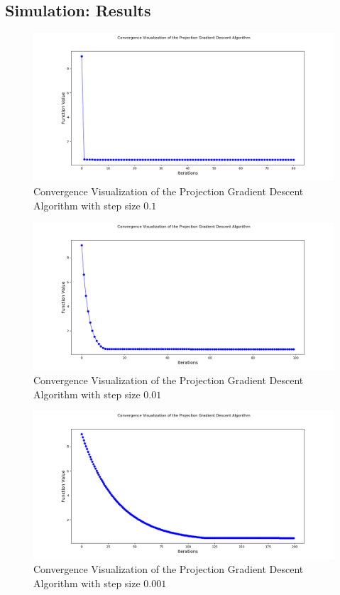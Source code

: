 \documentclass[12pt, draftcls, onecolumn]{IEEEtran}
\begin{document}
\subsection{Simulation: Results}
\begin{figure}[t]
\includegraphics[width=1.0\textwidth]{PGD_Convergence_Gamma_Point1.png}
\caption{Convergence Visualization of the Projection Gradient Descent Algorithm with step size $0.1$}
\label{fig:mesh1}
\centering
\end{figure}
\begin{figure}[t]
\includegraphics[width=1.0\textwidth]{PGD_Convergence_Gamma_Point01.png}
\caption{Convergence Visualization of the Projection Gradient Descent Algorithm with step size $0.01$}
\label{fig:mesh2}
\centering
\end{figure}
\begin{figure}[t]
\includegraphics[width=1.0\textwidth]{PGD_Convergence_Gamma_Point001.png}
\caption{Convergence Visualization of the Projection Gradient Descent Algorithm with step size $0.001$}
\label{fig:mesh3}
\centering
\end{figure}
\end{document}
